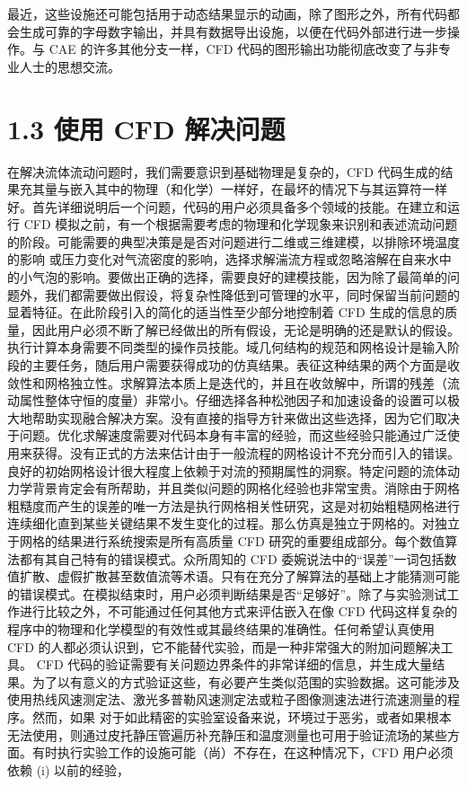 \documentclass[11pt,a4paper,openany,fontset=none]{ctexbook}
\begin{document}
最近，这些设施还可能包括用于动态结果显示的动画，除了图形之外，所有代码都会生成可靠的字母数字输出，并具有数据导出设施，以便在代码外部进行进一步操作。与 CAE 的许多其他分支一样，CFD 代码的图形输出功能彻底改变了与非专业人士的思想交流。

\section*{1.3 使用 CFD 解决问题}

在解决流体流动问题时，我们需要意识到基础物理是复杂的，CFD 代码生成的结果充其量与嵌入其中的物理（和化学）一样好，在最坏的情况下与其运算符一样好。首先详细说明后一个问题，代码的用户必须具备多个领域的技能。在建立和运行 CFD 模拟之前，有一个根据需要考虑的物理和化学现象来识别和表述流动问题的阶段。可能需要的典型决策是是否对问题进行二维或三维建模，以排除环境温度的影响
或压力变化对气流密度的影响，选择求解湍流方程或忽略溶解在自来水中的小气泡的影响。要做出正确的选择，需要良好的建模技能，因为除了最简单的问题外，我们都需要做出假设，将复杂性降低到可管理的水平，同时保留当前问题的显着特征。在此阶段引入的简化的适当性至少部分地控制着 CFD 生成的信息的质量，因此用户必须不断了解已经做出的所有假设，无论是明确的还是默认的假设。执行计算本身需要不同类型的操作员技能。域几何结构的规范和网格设计是输入阶段的主要任务，随后用户需要获得成功的仿真结果。表征这种结果的两个方面是收敛性和网格独立性。求解算法本质上是迭代的，并且在收敛解中，所谓的残差（流动属性整体守恒的度量）非常小。仔细选择各种松弛因子和加速设备的设置可以极大地帮助实现融合解决方案。没有直接的指导方针来做出这些选择，因为它们取决于问题。优化求解速度需要对代码本身有丰富的经验，而这些经验只能通过广泛使用来获得。没有正式的方法来估计由于一般流程的网格设计不充分而引入的错误。良好的初始网格设计很大程度上依赖于对流的预期属性的洞察。特定问题的流体动力学背景肯定会有所帮助，并且类似问题的网格化经验也非常宝贵。消除由于网格粗糙度而产生的误差的唯一方法是执行网格相关性研究，这是对初始粗糙网格进行连续细化直到某些关键结果不发生变化的过程。那么仿真是独立于网格的。对独立于网格的结果进行系统搜索是所有高质量 CFD 研究的重要组成部分。每个数值算法都有其自己特有的错误模式。众所周知的 CFD 委婉说法中的“误差”一词包括数值扩散、虚假扩散甚至数值流等术语。只有在充分了解算法的基础上才能猜测可能的错误模式。在模拟结束时，用户必须判断结果是否“足够好”。除了与实验测试工作进行比较之外，不可能通过任何其他方式来评估嵌入在像 CFD 代码这样复杂的程序中的物理和化学模型的有效性或其最终结果的准确性。任何希望认真使用 CFD 的人都必须认识到，它不能替代实验，而是一种非常强大的附加问题解决工具。 CFD 代码的验证需要有关问题边界条件的非常详细的信息，并生成大量结果。为了以有意义的方式验证这些，有必要产生类似范围的实验数据。这可能涉及使用热线风速测定法、激光多普勒风速测定法或粒子图像测速法进行流速测量的程序。然而，如果 对于如此精密的实验室设备来说，环境过于恶劣，或者如果根本无法使用，则通过皮托静压管遍历补充静压和温度测量也可用于验证流场的某些方面。有时执行实验工作的设施可能（尚）不存在，在这种情况下，CFD 用户必须依赖 (i) 以前的经验，
\end{document}
